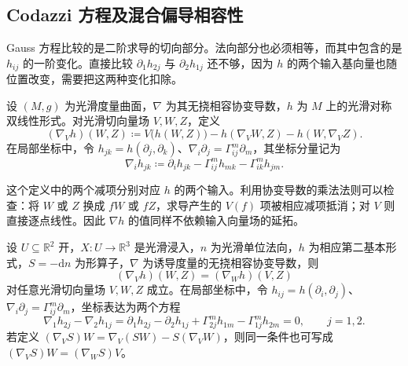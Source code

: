 \subsection{Codazzi 方程及混合偏导相容性}
\label{g1:subsec:0803:04}

Gauss 方程比较的是二阶求导的切向部分。法向部分也必须相等，而其中包含的是 \(h_{ij}\) 的一阶变化。直接比较 \(\partial_1h_{2j}\) 与 \(\partial_2h_{1j}\) 还不够，因为 \(h\) 的两个输入基向量也随位置改变，需要把这两种变化扣除。

\begin{definition}
	\label{g1:def:covariant-h-derivative}
	设 \((M,g)\) 为光滑度量曲面，\(\nabla\) 为其无挠相容协变导数，\(h\) 为 \(M\) 上的光滑对称双线性形式。对光滑切向量场 \(V,W,Z\)，定义
	\[
		(\nabla_Vh)(W,Z)
		\coloneqq V\bigl(h(W,Z)\bigr)-h(\nabla_VW,Z)-h(W,\nabla_VZ).
	\]
	在局部坐标中，令 \(h_{jk}=h(\partial_j,\partial_k)\)、\(\nabla_i\partial_j=\Gamma^m_{ij}\partial_m\)，其坐标分量记为
	\[
		\nabla_i h_{jk}\coloneqq\partial_i h_{jk}
		-\Gamma^m_{ij}h_{mk}-\Gamma^m_{ik}h_{jm}.
	\]
\end{definition}

这个定义中的两个减项分别对应 \(h\) 的两个输入。利用协变导数的乘法法则可以检查：将 \(W\) 或 \(Z\) 换成 \(fW\) 或 \(fZ\)，求导产生的 \(V(f)\) 项被相应减项抵消；对 \(V\) 则直接逐点线性。因此 \(\nabla h\) 的值同样不依赖输入向量场的延拓。

\begin{theorem}[Codazzi 方程]
	\label{g1:thm:codazzi-equation}
	设 \(U\subseteq\mathbb R^2\) 开，\(X:U\rightarrow\mathbb R^3\) 是光滑浸入，\(n\) 为光滑单位法向，\(h\) 为相应第二基本形式，\(S=-\mathrm{d}n\) 为形算子，\(\nabla\) 为诱导度量的无挠相容协变导数，则
	\[
		(\nabla_Vh)(W,Z)=(\nabla_Wh)(V,Z)
	\]
	对任意光滑切向量场 \(V,W,Z\) 成立。在局部坐标中，令 \(h_{ij}=h(\partial_i,\partial_j)\)、\(\nabla_i\partial_j=\Gamma^m_{ij}\partial_m\)，坐标表达为两个方程
	\begin{equation}
		\label{g1:eq:codazzi-components}
		\nabla_1h_{2j}-\nabla_2h_{1j}
		=\partial_1h_{2j}-\partial_2h_{1j}
		+\Gamma^m_{2j}h_{1m}-\Gamma^m_{1j}h_{2m}=0,
		\qquad j=1,2.
	\end{equation}
	若定义 \((\nabla_VS)W=\nabla_V(SW)-S(\nabla_VW)\)，则同一条件也可写成 \((\nabla_VS)W=(\nabla_WS)V\)。
\end{theorem}

